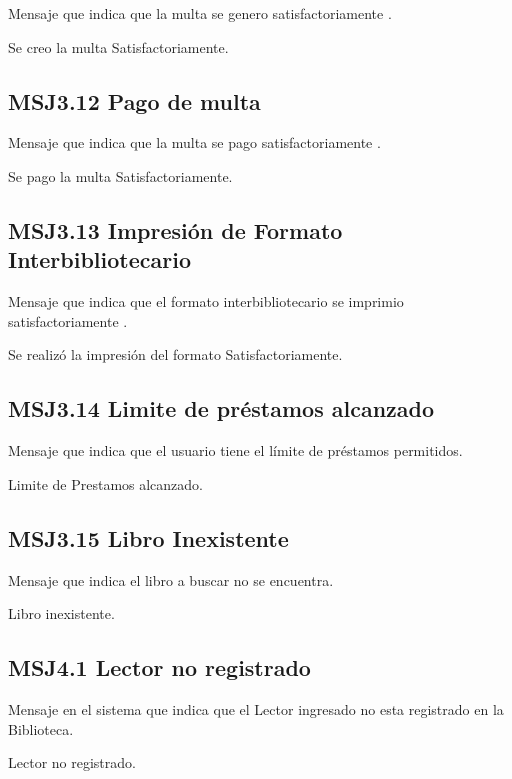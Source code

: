 Mensaje que indica que la multa se genero satisfactoriamente .

  \noindent Se creo la multa Satisfactoriamente.
  
\subsection{MSJ3.12 Pago de multa }

Mensaje que indica que la multa se pago satisfactoriamente .

  \noindent Se pago la multa Satisfactoriamente.
  
\subsection{MSJ3.13 Impresión de Formato Interbibliotecario }

Mensaje que indica que el formato interbibliotecario se imprimio satisfactoriamente .

  \noindent Se realizó la impresión del formato Satisfactoriamente.

\subsection{MSJ3.14 Limite de préstamos alcanzado }

Mensaje que indica que el usuario tiene el límite de préstamos permitidos.

  \noindent Limite de Prestamos alcanzado.
  
\subsection{MSJ3.15 Libro Inexistente }

Mensaje que indica el libro a buscar no se encuentra.

  \noindent Libro inexistente.
\subsection{MSJ4.1 Lector no registrado }

Mensaje en el sistema que indica que el Lector ingresado no esta registrado en la Biblioteca.

  \noindent Lector no registrado.
 
